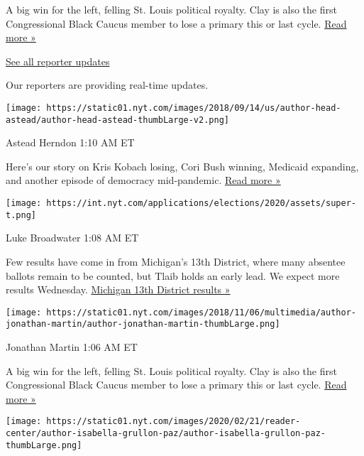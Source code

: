 A big win for the left, felling St. Louis political royalty. Clay is
also the first Congressional Black Caucus member to lose a primary this
or last cycle.
\href{https://www.nytimes.com/2020/08/05/us/politics/cori-bush-missouri-william-lacy-clay.html?action=click\&module=ELEX_results\&pgtype=Interactive\&region=ReporterUpdates}{Read
more »}

\href{https://www.nytimes.com/interactive/2020/08/04/us/elections/live-analysis-arizona-kansas-michigan-missouri-primaries.html?action=click\&module=ELEX_results\&pgtype=Interactive\&region=Component}{See
all reporter updates}

Our reporters are providing real-time updates.

\texttt{[image: https://static01.nyt.com/images/2018/09/14/us/author-head-astead/author-head-astead-thumbLarge-v2.png]}

Astead Herndon 1:10 AM ET

Here's our story on Kris Kobach losing, Cori Bush winning, Medicaid
expanding, and another episode of democracy mid-pandemic.
\href{https://www.nytimes.com/2020/08/04/us/politics/kobach-tlaib.html?action=click\&module=ELEX_results\&pgtype=Interactive\&region=ReporterUpdates}{Read
more »}

\texttt{[image: https://int.nyt.com/applications/elections/2020/assets/super-t.png]}

Luke Broadwater 1:08 AM ET

Few results have come in from Michigan's 13th District, where many
absentee ballots remain to be counted, but Tlaib holds an early lead. We
expect more results Wednesday.
\href{https://www.nytimes.com/interactive/2020/08/04/us/elections/results-michigan-house-district-13-primary-election.html?action=click\&module=ELEX_results\&pgtype=Interactive\&region=ReporterUpdates}{Michigan
13th District results »}

\texttt{[image: https://static01.nyt.com/images/2018/11/06/multimedia/author-jonathan-martin/author-jonathan-martin-thumbLarge.png]}

Jonathan Martin 1:06 AM ET

A big win for the left, felling St. Louis political royalty. Clay is
also the first Congressional Black Caucus member to lose a primary this
or last cycle.
\href{https://www.nytimes.com/2020/08/05/us/politics/cori-bush-missouri-william-lacy-clay.html?action=click\&module=ELEX_results\&pgtype=Interactive\&region=ReporterUpdates}{Read
more »}

\texttt{[image: https://static01.nyt.com/images/2020/02/21/reader-center/author-isabella-grullon-paz/author-isabella-grullon-paz-thumbLarge.png]}

